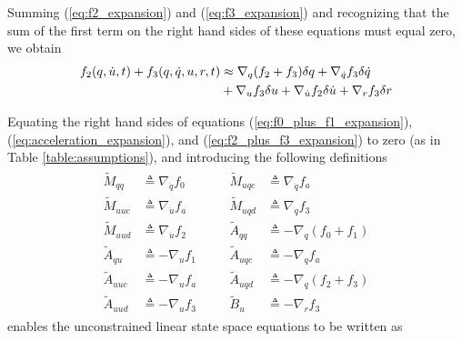Summing (\ref{eq:f2_expansion}) and (\ref{eq:f3_expansion}) and recognizing
that the sum of the first term on the right hand sides of these equations must
equal zero, we obtain
\begin{align}
  f_{2}(q, \dot{u}, t) + f_{3}(q, \dot{q},
  u, r, t) &\approx \nabla_{q}(f_2 + f_3)
  \delta{q} + \nabla_{\dot{q}}f_{3} \delta\dot{q}\notag\\
  \label{eq:f2_plus_f3_expansion}
  &+ \nabla_{u}f_{3} \delta{u} +
  \nabla_{\dot{u}}f_{2} \delta\dot{u} + \nabla_{r}f_{3} \delta{r}
\end{align}

Equating the right hand sides of equations (\ref{eq:f0_plus_f1_expansion}),
(\ref{eq:acceleration_expansion}),
and (\ref{eq:f2_plus_f3_expansion}) to zero (as in Table
\ref{table:assumptions}), and introducing the following definitions
\begin{align}
\label{eq:quant_to_compute}
  \begin{array}{llcll}
    \tilde{M}_{qq}  &\triangleq \nabla_{\dot{q}}f_0 & \quad &
    \tilde{M}_{uqc} &\triangleq \nabla_{\dot{q}}f_a \\
    \tilde{M}_{uuc} &\triangleq \nabla_{\dot{u}}f_a & \quad &
    \tilde{M}_{uqd} &\triangleq \nabla_{\dot{q}}f_3 \\
    \tilde{M}_{uud} &\triangleq \nabla_{\dot{u}}f_2 & \quad &
    \tilde{A}_{qq}  &\triangleq -\nabla_{q}(f_0 + f_1) \\
    \tilde{A}_{qu}  &\triangleq -\nabla_{u}f_1 & \quad &
    \tilde{A}_{uqc} &\triangleq - \nabla_{q} f_a \\
    \tilde{A}_{uuc} &\triangleq - \nabla_{u} f_a & \quad &
    \tilde{A}_{uqd} &\triangleq - \nabla_{q} (f_2 + f_3) \\
    \tilde{A}_{uud} &\triangleq - \nabla_{u} f_3 & \quad &
    \tilde{B}_{u}   &\triangleq -\nabla_{r}f_{3}
  \end{array}
\end{align}
enables the unconstrained linear state space equations to be written as

